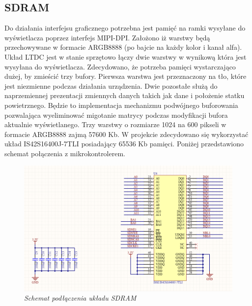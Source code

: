 \documentclass[eng,printmode]{mgr}
\begin{document}
\subsection*{SDRAM}
Do działania interfejsu graficznego potrzebna jest pamięć na ramki wysyłane do wyświetlacza poprzez interfejs MIPI-DPI. Założono iż warstwy będą przechowywane w formacie ARGB8888 (po bajcie na każdy kolor i kanał alfa). Układ LTDC jest w stanie sprzętowo łączy dwie warstwy w wynikową która jest wysyłana do wyświetlacza. Zdecydowano, że potrzeba pamięci wystarczająco dużej, by zmieścić trzy bufory. Pierwsza warstwa jest przeznaczony na tło, które jest niezmienne podczas działania urządzenia. Dwie pozostałe służą do naprzemiennej prezentacji zmiennych danych takich jak dane i położenie statku powietrznego. Będzie to implementacja mechanizmu podwójnego buforowania pozwalająca wyeliminować migotanie matrycy podczas modyfikacji bufora aktualnie wyświetlanego. Trzy warstwy o rozmiarze 1024 na 600 pikseli w formacie ARGB8888 zajmą 57600 Kb. W projekcie zdecydowano się wykorzystać układ IS42S16400J-7TLI posiadający 65536 Kb pamięci. Poniżej przedstawiono schemat połączenia z mikrokontrolerem.

\begin{figure}[!h]
    \centering
    \includegraphics[width=\textwidth]{schematics/sdram.png}
    \caption{\textit{Schemat podłączenia układu SDRAM}}
\end{figure}
\end{document}
